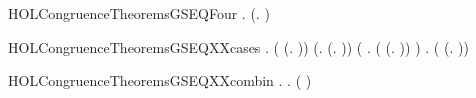 \newcommand{\HOLCongruenceTheoremsGSEQThreea}{\UseVerbatim{HOLCongruenceTheoremsGSEQThreea}}
\begin{SaveVerbatim}{HOLCongruenceTheoremsGSEQFour}
\HOLTokenTurnstile{} \HOLSymConst{\HOLTokenForall{}}   .
         \HOLSymConst{\HOLTokenConj{}}   \HOLSymConst{\HOLTokenImp{}}  (\HOLTokenLambda{}.   \HOLSymConst{+}  )
\end{SaveVerbatim}
\newcommand{\HOLCongruenceTheoremsGSEQFour}{\UseVerbatim{HOLCongruenceTheoremsGSEQFour}}
\begin{SaveVerbatim}{HOLCongruenceTheoremsGSEQXXcases}
\HOLTokenTurnstile{} \HOLSymConst{\HOLTokenForall{}}.
         \HOLSymConst{\HOLTokenEquiv{}}
       ( \HOLSymConst{=} (\HOLTokenLambda{}. )) \HOLSymConst{\HOLTokenDisj{}} (\HOLSymConst{\HOLTokenExists{}}.  \HOLSymConst{=} (\HOLTokenLambda{}. )) \HOLSymConst{\HOLTokenDisj{}}
       (\HOLSymConst{\HOLTokenExists{}} . ( \HOLSymConst{=} (\HOLTokenLambda{}.  )) \HOLSymConst{\HOLTokenConj{}}  ) \HOLSymConst{\HOLTokenDisj{}}
       \HOLSymConst{\HOLTokenExists{}}   .
           ( \HOLSymConst{=} (\HOLTokenLambda{}.   \HOLSymConst{+}  )) \HOLSymConst{\HOLTokenConj{}}   \HOLSymConst{\HOLTokenConj{}}  
\end{SaveVerbatim}
\newcommand{\HOLCongruenceTheoremsGSEQXXcases}{\UseVerbatim{HOLCongruenceTheoremsGSEQXXcases}}
\begin{SaveVerbatim}{HOLCongruenceTheoremsGSEQXXcombin}
\HOLTokenTurnstile{} \HOLSymConst{\HOLTokenForall{}}.   \HOLSymConst{\HOLTokenImp{}} \HOLSymConst{\HOLTokenForall{}}.   \HOLSymConst{\HOLTokenImp{}}  ( \HOLConst{\HOLTokenCompose} )
\end{SaveVerbatim}
